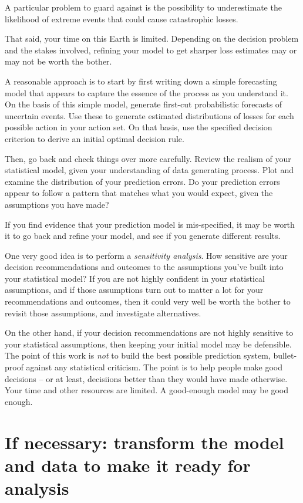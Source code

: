 \documentclass[
]{book}
\begin{document}
A particular problem to guard against is the possibility to underestimate the likelihood of extreme events that could cause catastrophic losses.

That said, your time on this Earth is limited. Depending on the decision problem and the stakes involved, refining your model to get sharper loss estimates may or may not be worth the bother.

A reasonable approach is to start by first writing down a simple forecasting model that appears to capture the essence of the process as you understand it. On the basis of this simple model, generate first-cut probabilistic forecasts of uncertain events. Use these to generate estimated distributions of losses for each possible action in your action set. On that basis, use the specified decision criterion to derive an initial optimal decision rule.

Then, go back and check things over more carefully. Review the realism of your statistical model, given your understanding of data generating process. Plot and examine the distribution of your prediction errors. Do your prediction errors appear to follow a pattern that matches what you would expect, given the assumptions you have made?

If you find evidence that your prediction model is mis-specified, it may be worth it to go back and refine your model, and see if you generate different results.

One very good idea is to perform a \emph{sensitivity analysis}. How sensitive are your decision recommendations and outcomes to the assumptions you've built into your statistical model? If you are not highly confident in your statistical assumptions, and if those assumptions turn out to matter a lot for your recommendations and outcomes, then it could very well be worth the bother to revisit those assumptions, and investigate alternatives.

On the other hand, if your decision recommendations are not highly sensitive to your statistical assumptions, then keeping your initial model may be defensible. The point of this work is \emph{not} to build the best possible prediction system, bullet-proof against any statistical criticism. The point is to help people make good decisions -- or at least, decisiions better than they would have made otherwise. Your time and other resources are limited. A good-enough model may be good enough.

\hypertarget{if-necessary-transform-the-model-and-data-to-make-it-ready-for-analysis}{%
\section{If necessary: transform the model and data to make it ready for analysis}\label{if-necessary-transform-the-model-and-data-to-make-it-ready-for-analysis}}
\end{document}
